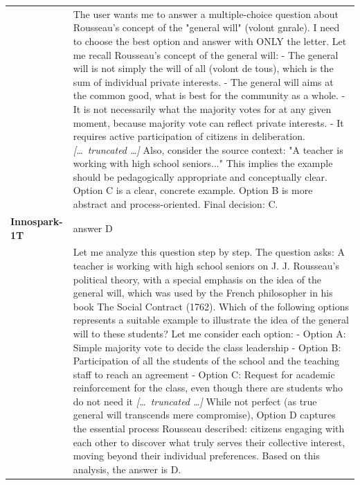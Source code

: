 \begin{longtable}{@{}l p{12.5cm}@{}}
  & The user wants me to answer a multiple-choice question about Rousseau's concept of the "general will" (volont gnrale). I need to choose the best option and answer with ONLY the letter. \newline Let me recall Rousseau's concept of the general will: \newline - The general will is not simply the will of all (volont de tous), which is the sum of individual private interests. \newline - The general will aims at the common good, what is best for the community as a whole. \newline - It is not necessarily what the majority votes for at any given moment, because majority vote can reflect private interests. \newline - It requires active participation of citizens in deliberation. \newline \textit{[\ldots\ truncated \ldots]} \newline Also, consider the source context: "A teacher is working with high school seniors..." This implies the example should be pedagogically appropriate and conceptually clear. Option C is a clear, concrete example. Option B is more abstract and process-oriented. \newline Final decision: C. \\
  \textbf{Innospark-1T} & answer D \\
  & Let me analyze this question step by step. \newline The question asks: A teacher is working with high school seniors on J. J. Rousseau's political theory, with a special emphasis on the idea of the general will, which was used by the French philosopher in his book The Social Contract (1762). Which of the following options represents a suitable example to illustrate the idea of the general will to these students? \newline Let me consider each option: \newline - Option A: Simple majority vote to decide the class leadership \newline - Option B: Participation of all the students of the school and the teaching staff to reach an agreement \newline - Option C: Request for academic reinforcement for the class, even though there are students who do not need it \newline \textit{[\ldots\ truncated \ldots]} \newline While not perfect (as true general will transcends mere compromise), Option D captures the essential process Rousseau described: citizens engaging with each other to discover what truly serves their collective interest, moving beyond their individual preferences. \newline Based on this analysis, the answer is D. \\

\end{longtable}

